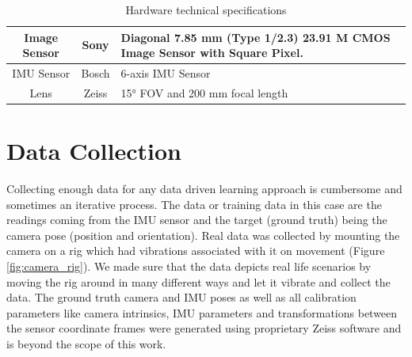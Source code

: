 \begin{table}[H]
    \centering
\begin{tabular}{| c| c | L |}
    \hline
     Image Sensor & 
     Sony & 
     Diagonal 7.85 mm (Type 1/2.3) 23.91 M CMOS Image Sensor with Square Pixel. \\
     \hline
     
     IMU Sensor & 
     Bosch & 
     6-axis IMU Sensor
     \\
     \hline
     
     Lens & 
     Zeiss & 
     15° FOV and 200 mm focal length \\

     \hline

\end{tabular}
    \caption{Hardware technical specifications}
    \label{tab:technical_details}
\end{table}



\section{Data Collection}
Collecting enough data for any data driven learning approach is cumbersome and sometimes an iterative process. The data or training data in this case are the readings coming from the IMU sensor and the target (ground truth) being the camera pose (position and orientation). Real data was collected by mounting the camera on a rig which had vibrations associated with it on movement (Figure \ref{fig:camera_rig}). We made sure that the data depicts real life scenarios by moving the rig around in many different ways and let it vibrate and collect the data. The ground truth camera and IMU poses as well as all calibration parameters like camera intrinsics, IMU parameters and transformations between the sensor coordinate frames were generated using proprietary Zeiss software and is beyond the scope of this work.

